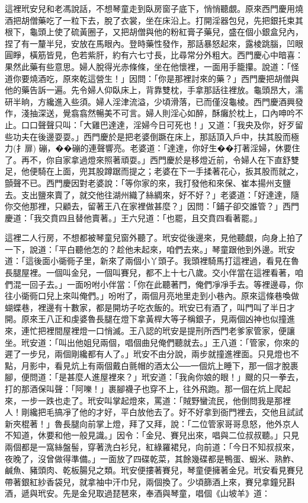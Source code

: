 這裡玳安兒和老馮說話，不想琴童走到臥房窗子底下，悄悄聽覷。原來西門慶用燒酒把胡僧藥吃了一粒下去，脫了衣裳，坐在床沿上。打開淫器包兒，先把銀托束其根下，龜頭上使了硫黃圈子，又把胡僧與他的粉紅膏子藥兒，盛在個小銀盒兒內，捏了有一釐半兒，安放在馬眼內。登時藥性發作，那話暴怒起來，露棱跳腦，凹眼圓睜，橫筋皆見，色若紫肝，約有六七寸長，比尋常分外粗大。西門慶心中暗喜：果然此藥有些意思。婦人脫得光赤條條，坐在他懷裡，一面用手籠攥。說道：「怪道你要燒酒吃，原來乾這營生！」因問：「你是那裡討來的藥？」西門慶把胡僧與他的藥告訴一遍。先令婦人仰臥床上，背靠雙枕，手拿那話往裡放。龜頭昂大，濡研半晌，方纔進入些須。婦人淫津流溢，少頃滑落，已而僅沒龜棱。西門慶酒興發作，淺抽深送，覺翕翕然暢美不可言。婦人則淫心如醉，酥癱於枕上，口內呻吟不止。口口聲聲只叫：「大雞巴達達，淫婦今日可死也！」又道：「我央及你，好歹留些功夫在後邊耍耍。」西門慶於是把老婆倒蹶在床上，那話頂入戶中，扶其股而極力(扌扉) 磞，��磞的連聲響亮。老婆道：「達達，你好生��打著淫婦，休要住了。再不，你自家拿過燈來照著頑耍。」西門慶於是移燈近前，令婦人在下直舒雙足，他便騎在上面，兜其股蹲踞而提之；老婆在下一手揉著花心，扳其股而就之，顫聲不已。西門慶因對老婆說：「等你家的來，我打發他和來保、崔本揚州支鹽去。支出鹽來賣了，就交他往湖州織了絲綢來，好不好？」老婆道：「好達達，隨你交他那裡，只顧去，留著王八在家裡做甚麼？」因問：「鋪子卻交誰管？」西門慶道：「我交賁四且替他賣著。」王六兒道：「也罷，且交賁四看著罷。」

這裡二人行房，不想都被琴童兒窗外聽了。玳安從後邊來，見他聽覷，向身上拍了一下，說道：「平白聽他怎的？趁他未起來，咱們去來。」琴童跟他到外邊。玳安道：「這後面小衚衕子里，新來了兩個小丫頭子。我頭裡騎馬打這裡過，看見在魯長腿屋裡。一個叫金兒，一個叫賽兒，都不上十七八歲。交小伴當在這裡看著，咱們混一回子去。」一面吩咐小伴當：「你在此聽著門，俺們凈凈手去。等裡邊尋，你往小衚衕口兒上來叫俺們。」吩咐了，兩個月亮地里走到小巷內。原來這條巷喚做蝴蝶巷，裡邊有十數家，都是開坊子吃衣飯的。玳安已有酒了，叫門叫了半日才開。原來王八正和虔婆魯長腿在燈下拿黃桿大等子稱銀子，見兩個凶神也似撞進來，連忙把裡間屋裡燈一口悄滅。王八認的玳安是提刑所西門老爹家管家，便讓坐。玳安道：「叫出他姐兒兩個，唱個曲兒俺們聽就去。」王八道：「管家，你來的遲了一步兒，兩個剛纔都有人了。」玳安不由分說，兩步就撞進裡面。只見燈也不點，月影中，看見炕上有兩個戴白氈帽的酒太公──一個炕上睡下，那一個才脫裹腳，便問道：「是甚麼人進屋裡來？」玳安道：「我肏你娘的眼！」颼的只一拳去，打的那酒保叫聲：「阿嚛！」裹腳襪子也穿不上，往外飛跑。那一個在炕上爬起來，一步一跌也走了。玳安叫掌起燈來，罵道：「賊野蠻流民，他倒問我是那裡人！剛纔把毛搞凈了他的才好，平白放他去了。好不好拿到衙門裡去，交他且試試新夾棍著！」魯長腿向前掌上燈，拜了又拜，說：「二位管家哥哥息怒，他外京人不知道，休要和他一般見識。」因令：「金兒、賽兒出來，唱與二位叔叔聽。」只見兩個都是一窩絲盤髻，穿著洗白衫兒，紅綠羅裙兒，向前道：「今日不知叔叔來，夜晚了，沒曾做得準備。」一面放了四碟乾菜，其餘幾碟都是鴨蛋、蝦米、熟鮓、鹹魚、豬頭肉、乾板腸兒之類。玳安便摟著賽兒，琴童便擁著金兒。玳安看見賽兒帶著銀紅紗香袋兒，就拿袖中汗巾兒，兩個換了。少頃篩酒上來，賽兒拿鐘兒斟酒，遞與玳安。先是金兒取過琵琶來，奉酒與琴童，唱個《山坡羊》道：

